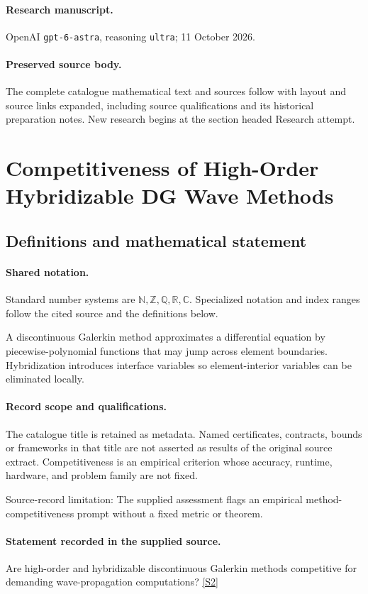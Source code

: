 \documentclass[11pt]{article}
\begin{document}
\paragraph{Research manuscript.} OpenAI \texttt{gpt-6-astra}, reasoning \texttt{ultra}; 11 October 2026.
\paragraph{Preserved source body.} The complete catalogue mathematical text and sources follow with layout and source links expanded, including source qualifications and its historical preparation notes. New research begins at the section headed Research attempt.

\section{Competitiveness of High-Order Hybridizable DG Wave Methods}\label{statement}

\subsection{Definitions and mathematical statement}

\paragraph{Shared notation.}Standard number systems are $\mathbb N,\mathbb Z,\mathbb Q,\mathbb R,\mathbb C$. Specialized notation and index ranges follow the cited source and the definitions below.


A discontinuous Galerkin method approximates a differential equation by piecewise-polynomial functions that may jump across element boundaries. Hybridization introduces interface variables so element-interior variables can be eliminated locally.
\paragraph{Record scope and qualifications.}
The catalogue title is retained as metadata. Named certificates, contracts, bounds or frameworks in that title are not asserted as results of the original source extract.
Competitiveness is an empirical criterion whose accuracy, runtime, hardware, and problem family are not fixed.

Source-record limitation: The supplied assessment flags an empirical method-competitiveness prompt without a fixed metric or theorem.
\paragraph{Statement recorded in the supplied source.}
Are high-order and hybridizable discontinuous Galerkin methods competitive for demanding wave-propagation computations? \href{https://doi.org/10.4171/owr/2012/09}{[S2]}
\end{document}
